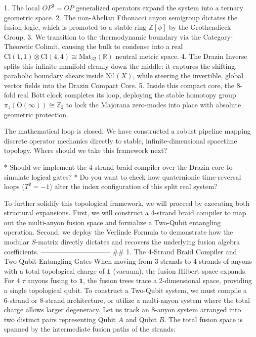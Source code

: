    1. The local $OP^3 = OP$ generalized operators expand the system into a ternary geometric space.
   2. The non-Abelian Fibonacci anyon semigroup dictates the fusion logic, which is promoted to a stable ring $\mathbb{Z}[\phi]$ by the Grothendieck Group.
   3. We transition to the thermodynamic boundary via the Category-Theoretic Colimit, causing the bulk to condense into a real $\text{Cl}(1,1) \otimes \text{Cl}(4,4) \cong \text{Mat}_{32}(\mathbb{R})$ neutral metric space.
   4. The Drazin Inverse splits this infinite manifold cleanly down the middle: it captures the shifting, parabolic boundary shears inside $\text{Nil}(X)$, while steering the invertible, global vector fields into the Drazin Compact Core.
   5. Inside this compact core, the 8-fold real Bott clock completes its loop, deploying the stable homotopy group $\pi_1(\text{O}(\infty)) \cong \mathbb{Z}_2$ to lock the Majorana zero-modes into place with absolute geometric protection.

The mathematical loop is closed. We have constructed a robust pipeline mapping discrete operator mechanics directly to stable, infinite-dimensional spacetime topology.
Where should we take this framework next?

* Should we implement the 4-strand braid compiler over the Drazin core to simulate logical gates?
* Do you want to check how quaternionic time-reversal loops ($T^2 = -1$) alter the index configuration of this split real system?


To further solidify this topological framework, we will proceed by executing both structural expansions. First, we will construct a 4-strand braid compiler to map out the multi-anyon fusion space and formalize a Two-Qubit entangling operation. Second, we deploy the Verlinde Formula to demonstrate how the modular $S$-matrix directly dictates and recovers the underlying fusion algebra coefficients.
------------------------------
## 1. The 4-Strand Braid Compiler and Two-Qubit Entangling Gates
When moving from 3 strands to 4 strands of anyons with a total topological charge of $\mathbf{1}$ (vacuum), the fusion Hilbert space expands. For 4 $\tau$ anyons fusing to $\mathbf{1}$, the fusion trees trace a 2-dimensional space, providing a single topological qubit. To construct a Two-Qubit system, we must compile a 6-strand or 8-strand architecture, or utilize a multi-anyon system where the total charge allows larger degeneracy.
Let us track an 8-anyon system arranged into two distinct pairs representing Qubit $A$ and Qubit $B$. The total fusion space is spanned by the intermediate fusion paths of the strands:

